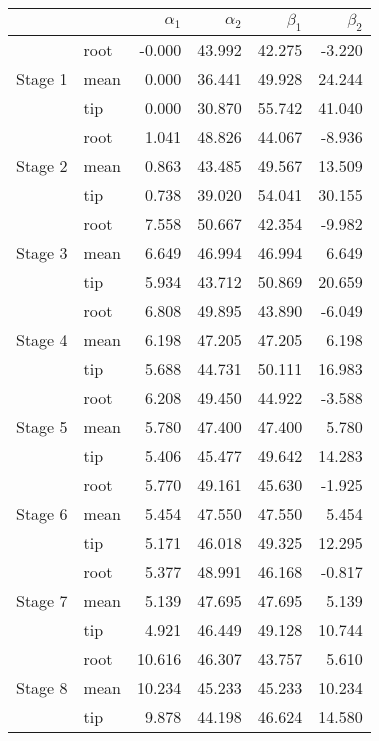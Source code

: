 \begin{center}
\begin{tabular}{llrrrr}
\toprule
 &  & $\alpha_{1}$ & $\alpha_{2}$ & $\beta_{1}$ & $\beta_{2}$ \\
\midrule
\multirow[t]{3}{*}{Stage 1} & root & -0.000 & 43.992 & 42.275 & -3.220 \\
 & mean & 0.000 & 36.441 & 49.928 & 24.244 \\
 & tip & 0.000 & 30.870 & 55.742 & 41.040 \\
\cline{1-6}
\multirow[t]{3}{*}{Stage 2} & root & 1.041 & 48.826 & 44.067 & -8.936 \\
 & mean & 0.863 & 43.485 & 49.567 & 13.509 \\
 & tip & 0.738 & 39.020 & 54.041 & 30.155 \\
\cline{1-6}
\multirow[t]{3}{*}{Stage 3} & root & 7.558 & 50.667 & 42.354 & -9.982 \\
 & mean & 6.649 & 46.994 & 46.994 & 6.649 \\
 & tip & 5.934 & 43.712 & 50.869 & 20.659 \\
\cline{1-6}
\multirow[t]{3}{*}{Stage 4} & root & 6.808 & 49.895 & 43.890 & -6.049 \\
 & mean & 6.198 & 47.205 & 47.205 & 6.198 \\
 & tip & 5.688 & 44.731 & 50.111 & 16.983 \\
\cline{1-6}
\multirow[t]{3}{*}{Stage 5} & root & 6.208 & 49.450 & 44.922 & -3.588 \\
 & mean & 5.780 & 47.400 & 47.400 & 5.780 \\
 & tip & 5.406 & 45.477 & 49.642 & 14.283 \\
\cline{1-6}
\multirow[t]{3}{*}{Stage 6} & root & 5.770 & 49.161 & 45.630 & -1.925 \\
 & mean & 5.454 & 47.550 & 47.550 & 5.454 \\
 & tip & 5.171 & 46.018 & 49.325 & 12.295 \\
\cline{1-6}
\multirow[t]{3}{*}{Stage 7} & root & 5.377 & 48.991 & 46.168 & -0.817 \\
 & mean & 5.139 & 47.695 & 47.695 & 5.139 \\
 & tip & 4.921 & 46.449 & 49.128 & 10.744 \\
\cline{1-6}
\multirow[t]{3}{*}{Stage 8} & root & 10.616 & 46.307 & 43.757 & 5.610 \\
 & mean & 10.234 & 45.233 & 45.233 & 10.234 \\
 & tip & 9.878 & 44.198 & 46.624 & 14.580 \\
\cline{1-6}
\bottomrule
\end{tabular}
\end{center}

